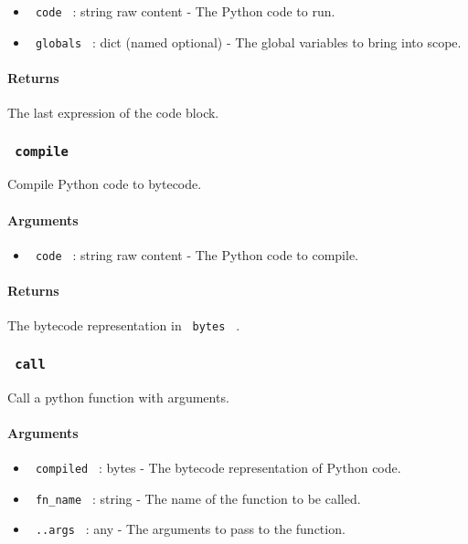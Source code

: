 \begin{itemize}
\tightlist
\item
  \texttt{\ code\ } : string \textbar{} raw content - The Python code to
  run.
\item
  \texttt{\ globals\ } : dict (named optional) - The global variables to
  bring into scope.
\end{itemize}

\paragraph{Returns}\label{returns}

The last expression of the code block.

\subsubsection{\texorpdfstring{\texttt{\ compile\ }}{ compile }}\label{compile}

Compile Python code to bytecode.

\paragraph{Arguments}\label{arguments-1}

\begin{itemize}
\tightlist
\item
  \texttt{\ code\ } : string \textbar{} raw content - The Python code to
  compile.
\end{itemize}

\paragraph{Returns}\label{returns-1}

The bytecode representation in \texttt{\ bytes\ } .

\subsubsection{\texorpdfstring{\texttt{\ call\ }}{ call }}\label{call}

Call a python function with arguments.

\paragraph{Arguments}\label{arguments-2}

\begin{itemize}
\tightlist
\item
  \texttt{\ compiled\ } : bytes - The bytecode representation of Python
  code.
\item
  \texttt{\ fn\_name\ } : string - The name of the function to be
  called.
\item
  \texttt{\ ..args\ } : any - The arguments to pass to the function.
\end{itemize}


